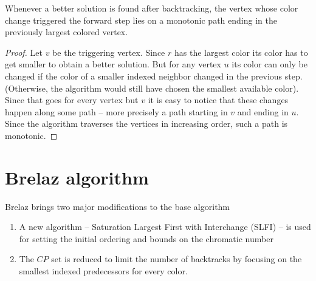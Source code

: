 \begin{theorem}
    Whenever a better solution is found after backtracking, the vertex whose color change triggered the forward step lies on a monotonic path ending in the previously largest colored vertex.
\end{theorem}
\begin{proof}
    Let $v$ be the triggering vertex. Since $r$ has the largest color its color has to get smaller to obtain a better solution. But for any vertex $u$ its color can only be changed if the color of a smaller indexed neighbor changed in the previous step. (Otherwise, the algorithm would still have chosen the smallest available color). Since that goes for every vertex but $v$ it is easy to notice that these changes happen along some path -- more precisely a path starting in $v$ and ending in $u$. Since the algorithm traverses the vertices in increasing order, such a path is monotonic.
\end{proof}

\section{Brelaz algorithm}
Brelaz brings two major modifications to the base algorithm
\begin{enumerate}
    \item A new algorithm -- Saturation Largest First with Interchange (SLFI) -- is used for setting the initial ordering and bounds on the chromatic number
    \item The $CP$ set is reduced to limit the number of backtracks by focusing on the smallest indexed predecessors for every color.
\end{enumerate}

